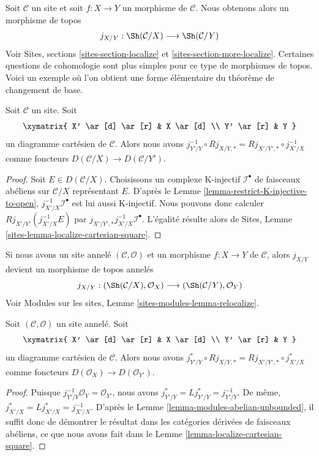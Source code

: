\noindent
Soit $\mathcal{C}$ un site et soit $f : X \to Y$ un morphisme de
$\mathcal{C}$. Nous obtenons alors un morphisme de topos
$$
j_{X/Y} : \Sh(\mathcal{C}/X) \longrightarrow \Sh(\mathcal{C}/Y)
$$
Voir Sites, sections \ref{sites-section-localize} et
\ref{sites-section-more-localize}. Certaines questions de cohomologie sont
plus simples pour ce type de morphismes de topos. Voici un exemple où l'on
obtient une forme élémentaire du théorème de changement de base.

\begin{lemma}
\label{lemma-localize-cartesian-square}
Soit $\mathcal{C}$ un site. Soit
$$
\xymatrix{
X' \ar[d] \ar[r] & X \ar[d] \\
Y' \ar[r] & Y
}
$$
un diagramme cartésien de $\mathcal{C}$. Alors nous avons
$j_{Y'/Y}^{-1} \circ Rj_{X/Y, *} = Rj_{X'/Y', *} \circ j_{X'/X}^{-1}$
comme foncteurs $D(\mathcal{C}/X) \to D(\mathcal{C}/Y')$.
\end{lemma}

\begin{proof}
Soit $E \in D(\mathcal{C}/X)$. Choisissons un complexe K-injectif
$\mathcal{I}^\bullet$ de faisceaux abéliens sur $\mathcal{C}/X$
représentant $E$. D'après le Lemme
\ref{lemma-restrict-K-injective-to-open},
$j_{X'/X}^{-1}\mathcal{I}^\bullet$ est lui aussi K-injectif. Nous pouvons
donc calculer $Rj_{X'/Y'}(j_{X'/X}^{-1}E)$ par
$j_{X'/Y', *}j_{X'/X}^{-1}\mathcal{I}^\bullet$. L'égalité résulte alors de
Sites, Lemme \ref{sites-lemma-localize-cartesian-square}.
\end{proof}

\noindent
Si nous avons un site annelé $(\mathcal{C}, \mathcal{O})$ et un morphisme
$f : X \to Y$ de $\mathcal{C}$, alors $j_{X/Y}$ devient un morphisme de
topos annelés
$$
j_{X/Y} :
(\Sh(\mathcal{C}/X), \mathcal{O}_X)
\longrightarrow
(\Sh(\mathcal{C}/Y), \mathcal{O}_Y)
$$
Voir Modules sur les sites, Lemme
\ref{sites-modules-lemma-relocalize}.

\begin{lemma}
\label{lemma-localize-cartesian-square-modules}
Soit $(\mathcal{C}, \mathcal{O})$ un site annelé. Soit
$$
\xymatrix{
X' \ar[d] \ar[r] & X \ar[d] \\
Y' \ar[r] & Y
}
$$
un diagramme cartésien de $\mathcal{C}$. Alors nous avons
$j_{Y'/Y}^* \circ Rj_{X/Y, *} = Rj_{X'/Y', *} \circ j_{X'/X}^*$
comme foncteurs
$D(\mathcal{O}_X) \to D(\mathcal{O}_{Y'})$.
\end{lemma}

\begin{proof}
Puisque $j_{Y'/Y}^{-1}\mathcal{O}_Y = \mathcal{O}_{Y'}$, nous avons
$j_{Y'/Y}^* = Lj_{Y'/Y}^* = j_{Y'/Y}^{-1}$. De même,
$j_{X'/X}^* = Lj_{X'/X}^* = j_{X'/X}^{-1}$. D'après le Lemme
\ref{lemma-modules-abelian-unbounded}, il suffit donc de démontrer le
résultat dans les catégories dérivées de faisceaux abéliens, ce que nous
avons fait dans le Lemme \ref{lemma-localize-cartesian-square}.
\end{proof}












